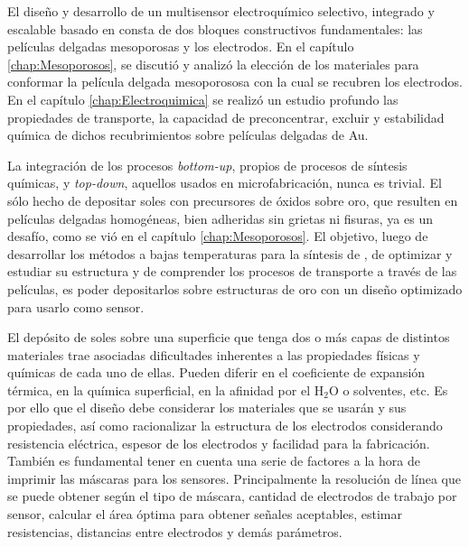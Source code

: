 	El diseño y desarrollo de un multisensor electroquímico selectivo, integrado y escalable basado en \pdm\space consta de dos bloques constructivos fundamentales: las películas delgadas mesoporosas y los electrodos. En el capítulo \ref{chap:Mesoporosos}, se discutió y analizó la elección de los materiales para conformar la película delgada mesoporososa con la cual se recubren los electrodos. En el capítulo \ref{chap:Electroquimica} se realizó un estudio profundo las propiedades de transporte, la capacidad de preconcentrar, excluir y estabilidad química de dichos recubrimientos sobre películas delgadas de Au.

	La integración de los procesos \textit{bottom-up}, propios de procesos de síntesis químicas, y \textit{top-down}, aquellos usados en microfabricación, nunca es trivial. El sólo hecho de depositar soles con precursores de óxidos sobre oro, que resulten en películas delgadas homogéneas, bien adheridas sin grietas ni fisuras, ya es un desafío, como se vió en el capítulo \ref{chap:Mesoporosos}. El objetivo, luego de desarrollar los métodos a bajas temperaturas para la síntesis de \pdm, de optimizar y estudiar su estructura y de comprender los procesos de transporte a través de las películas, es poder depositarlos sobre estructuras de oro con un diseño optimizado para usarlo como sensor. 

	El depósito de soles sobre una superficie que tenga dos o más capas de distintos  materiales trae asociadas dificultades inherentes a las propiedades físicas y químicas de cada uno de ellas. Pueden diferir en el coeficiente de expansión térmica, en la química superficial, en la afinidad por el H$_2$O o solventes, etc.
	Es por ello que el diseño debe considerar los materiales que se usarán y sus propiedades, así como racionalizar la estructura de los electrodos considerando resistencia eléctrica, espesor de los electrodos y facilidad para la fabricación. También es fundamental tener en cuenta una serie de factores a la hora de imprimir las máscaras para los sensores. Principalmente la resolución de línea que se puede obtener según el tipo de máscara, cantidad de electrodos de trabajo por sensor, calcular el área óptima para obtener señales aceptables, estimar resistencias, distancias entre electrodos y demás parámetros.

